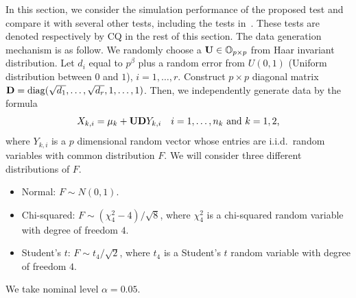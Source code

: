 \documentclass[review]{elsarticle}
\DeclareMathOperator{\mydiag}{diag}
\theoremstyle{plain}
\theoremstyle{definition}
\theoremstyle{remark}
\begin{document}
In this section, we consider the simulation performance of the proposed test and compare it with several other tests, including the tests in~\cite{Chen2010A}.
These tests are denoted respectively by CQ in the rest of this section.
The data generation mechanism is as follow.
We randomly choose a $\mathbf{U}\in\mathbb{O}_{p\times p}$ from Haar invariant distribution.
Let $d_{i}$ equal to $p^{\beta}$ plus a random error from $U(0,1)$ (Uniform distribution between $0$ and $1$), $i=1,\ldots, r$.
Construct $p\times p$ diagonal matrix $\BD=\mydiag(\sqrt{d_1},\ldots,\sqrt{d_r}, 1,\ldots, 1)$.
Then, we independently generate data by the formula
$$
X_{k,i}=\mu_k+\mathbf{U} \mathbf{D} Y_{k,i}\quad \text{$i=1,\ldots,n_k$ and $k=1,2$,}
$$
where $Y_{k,i}$ is a $p$ dimensional random vector whose entries are i.i.d.\ random variables with common distribution $F$.
We will consider three different distributions of $F$.
\begin{itemize}
    \item
        Normal: $F {\sim} N(0,1)$.
    \item
        Chi-squared:  $F\sim (\chi^2_4-4)/\sqrt{8}$, where $\chi^2_4$ is a chi-squared random variable with degree of freedom $4$.
    \item
        Student's $t$: $F\sim t_4/\sqrt{2}$, where $t_4$ is a Student's $t$ random variable  with degree of freedom $4$.
\end{itemize}
We take nominal level $\alpha=0.05$.

\end{document}
